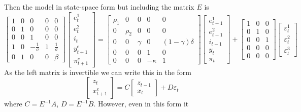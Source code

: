 \documentclass[
  letterpaper,
]{book}
\begin{document}
Then the model in state-space form but including the matrix \(E\) is \[
\begin{bmatrix} 1 & 0 & 0 & 0 & 0 \\ 
                0 & 1 & 0 & 0 & 0 \\ 
                0 & 0 & 1 & 0 & 0 \\ 
                1 & 0 & -\frac{1}{\sigma} & 1 & \frac{1}{\sigma} \\ 
                0 & 1 & 0 & 0 & \beta
\end{bmatrix}
\begin{bmatrix} e^1_t \\ e^2_t \\ i_t \\ y^e_{t+1} \\ \pi^e_{t+1} \end{bmatrix} 
   = 
   \begin{bmatrix} \rho_1 & 0 & 0 & 0 & 0 \\ 
                0 & \rho_2 & 0 & 0 & 0 \\ 
                0 & 0 & \gamma & 0 & (1-\gamma)\delta \\ 
                0 & 0 & 0 & 1 & 0 \\ 
                0 & 0 & 0 & -\kappa & 1
   \end{bmatrix}
\begin{bmatrix} e^1_{t-1} \\ e^2_{t-1} \\ i_{t-1} \\ y_t \\ \pi_t \end{bmatrix}    
   + 
      \begin{bmatrix} 
                1 & 0 & 0  \\ 
                0 & 1 & 0 \\ 
                0 & 0 & 1 \\ 
                0 & 0 & 0 \\ 
                0 & 0 & 0 
   \end{bmatrix}
   \begin{bmatrix} \varepsilon^1_t \\ \varepsilon^2_t \\ \varepsilon^3_t \end{bmatrix}    
\] As the left matrix is invertible we can write this in the form \[
\begin{bmatrix} z_t \\ x_{t+1}^e \end{bmatrix} = C \begin{bmatrix} z_{t-1} \\ x_t \end{bmatrix} + D \varepsilon_t  
\] where \(C = E^{-1}A\), \(D=E^{-1}B\). However, even in this form it
\end{document}
